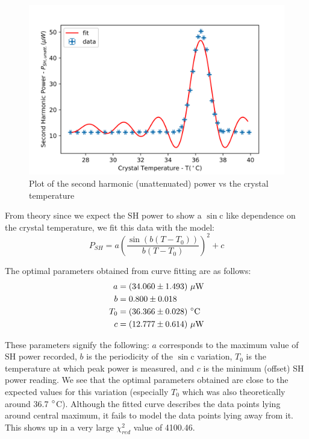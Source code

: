 \begin{figure}[H]
\includegraphics[scale=1]{./imagesandplots/shpowvstemp.png}
\centering
\caption{Plot of the second harmonic (unattenuated) power vs the crystal temperature}
\label{figexpt8}
\end{figure} 
 
From theory since we expect the SH power to show a $\sin$c like dependence on the crystal temperature, we fit this data with the model:
\begin{equation}
P_{SH}=a\left(\dfrac{\sin(b(T-T_{0}))}{b(T-T_{0})}\right)^{2}+c
\end{equation}

The optimal parameters obtained from curve fitting are as follows:
\begin{align}
a&=(34.060 \pm 1.493)\ \mu\rm{W}\\
b&=0.800\pm 0.018\\
T_{0}&=(36.366\pm 0.028)\ \degree \rm{C}\\
c&=(12.777\pm 0.614)\ \mu\rm{W}
\end{align}

These parameters signify the following: $a$ corresponds to the maximum value of SH power recorded, $b$ is the periodicity of the $\sin$c variation, $T_{0}$ is the temperature at which peak power is measured, and $c$ is the minimum (offset) SH power reading. We see that the optimal parameters obtained are close to the expected values for this variation (especially $T_{0}$ which was also theoretically around 36.7 $\degree$C). Although the fitted curve describes the data points lying around central maximum, it fails to model the data points lying away from it. This shows up in a very large $\chi_{red}^{2}$ value of 4100.46.

